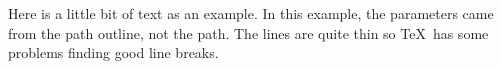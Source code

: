 \begin{minipage}[t]{150bp}

Here is a little bit of text as an example.
In this example, the parameters came from the path
outline, not the path. The lines are quite thin so 
\TeX\ has some problems finding good line breaks.
\par
\end{minipage}
